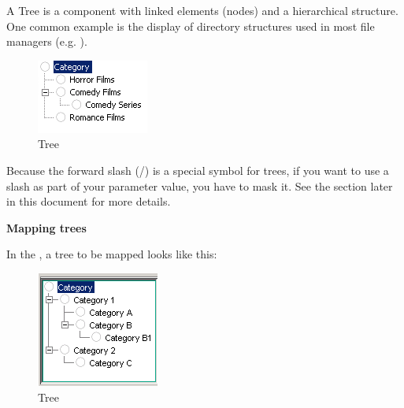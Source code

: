 A Tree is a component with linked
elements (nodes) and a hierarchical structure. One common example is
the display of directory structures used in most file managers
(e.g. ).

\begin{figure}
\begin{center}
\includegraphics{PS/Tree}
\caption{Tree}
\label{tree}
\end{center}
\end{figure}


Because the forward slash (/) is a special symbol for trees, if you want to use a slash as part of your parameter value, you have to mask it. See the section later in this document  for more details. 

\textbf{Mapping trees}

In the \gdomm{}, a tree to be mapped looks like this:

\begin{figure}
\begin{center}
\includegraphics{PS/Maptree}
\caption{Tree}
\label{maptree}
\end{center}
\end{figure}

